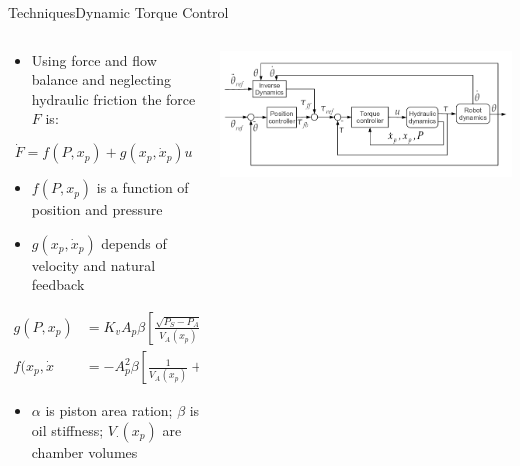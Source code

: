\documentclass{beamer}
\begin{document}
\begin{frame}{Techniques}{Dynamic Torque Control\cite{6224628}}
\begin{columns}
    \begin{column}{0.47\textwidth}\begin{scriptsize}
		\begin{itemize}
			\item Using force and flow balance and neglecting hydraulic friction the force $F$ is:
		\end{itemize}
		\begin{tiny}
		\begin{equation*}
		\dot{F}= f(P,x_p) + g(x_p,\dot{x}_p)u
		\end{equation*}\end{tiny}
		\begin{itemize}
			\item $f(P,x_p)$ is a function of position and pressure
			\item $g(x_p,\dot{x}_p)$ depends of velocity and natural feedback
		\end{itemize}
		\begin{tiny}
		\begin{align*}
		g(P,x_p) &= K_vA_p\beta \left[ \frac{\sqrt{P_S-P_A}}{V_A(x_p)} + \frac{\alpha\sqrt{P_B-P_T}}{V_B(x_p}\right] \\
		f(x_p,\dot{x} &= -A^2_p\beta\left[\frac{1}{V_A(x_p)} + \frac{\alpha^2}{V_B(x_p)}\right]\dot{x}
		\end{align*}\end{tiny}
		\begin{itemize}
			\item $\alpha$ is piston area ration; $\beta$ is oil stiffness; $V_\cdot(x_p)$ are chamber volumes 
		\end{itemize}    
    \end{scriptsize}
    \end{column}
    \begin{column}{0.5\textwidth}
        \includegraphics[scale=.2]{./images/dynamics.png}
    \end{column}
\end{columns}
\end{frame}
\end{document}
